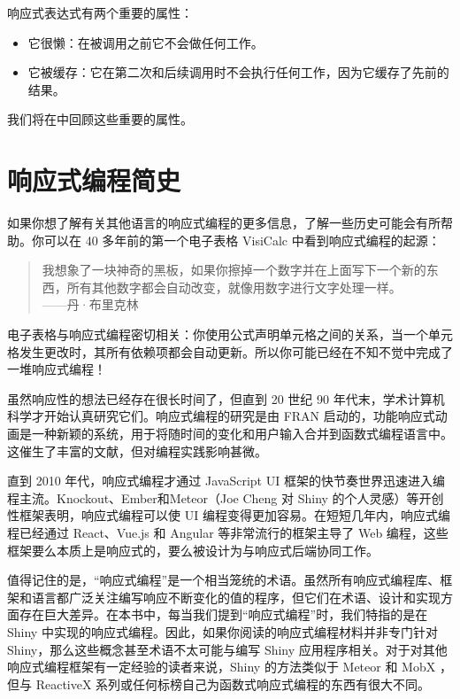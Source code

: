响应式表达式有两个重要的属性：
\begin{itemize}
    \item 它很懒：在被调用之前它不会做任何工作。
    \item 它被缓存：它在第二次和后续调用时不会执行任何工作，因为它缓存了先前的结果。
\end{itemize}
我们将在中回顾这些重要的属性。
\section{响应式编程简史}
如果你想了解有关其他语言的响应式编程的更多信息，了解一些历史可能会有所帮助。你可以在 40 多年前的第一个电子表格 VisiCalc 中看到响应式编程的起源：

\begin{quote}
    我想象了一块神奇的黑板，如果你擦掉一个数字并在上面写下一个新的东西，所有其他数字都会自动改变，就像用数字进行文字处理一样。\\——丹·布里克林
\end{quote}


电子表格与响应式编程密切相关：你使用公式声明单元格之间的关系，当一个单元格发生更改时，其所有依赖项都会自动更新。所以你可能已经在不知不觉中完成了一堆响应式编程！

虽然响应性的想法已经存在很长时间了，但直到 20 世纪 90 年代末，学术计算机科学才开始认真研究它们。响应式编程的研究是由 FRAN 启动的，功能响应式动画是一种新颖的系统，用于将随时间的变化和用户输入合并到函数式编程语言中。这催生了丰富的文献，但对编程实践影响甚微。

直到 2010 年代，响应式编程才通过 JavaScript UI 框架的快节奏世界迅速进入编程主流。Knockout、Ember和Meteor（Joe Cheng 对 Shiny 的个人灵感）等开创性框架表明，响应式编程可以使 UI 编程变得更加容易。在短短几年内，响应式编程已经通过 React、Vue.js 和 Angular 等非常流行的框架主导了 Web 编程，这些框架要么本质上是响应式的，要么被设计为与响应式后端协同工作。

值得记住的是，“响应式编程”是一个相当笼统的术语。虽然所有响应式编程库、框架和语言都广泛关注编写响应不断变化的值的程序，但它们在术语、设计和实现方面存在巨大差异。在本书中，每当我们提到“响应式编程”时，我们特指的是在 Shiny 中实现的响应式编程。因此，如果你阅读的响应式编程材料并非专门针对 Shiny，那么这些概念甚至术语不太可能与编写 Shiny 应用程序相关。对于对其他响应式编程框架有一定经验的读者来说，Shiny 的方法类似于 Meteor 和 MobX ，但与 ReactiveX 系列或任何标榜自己为函数式响应式编程的东西有很大不同。